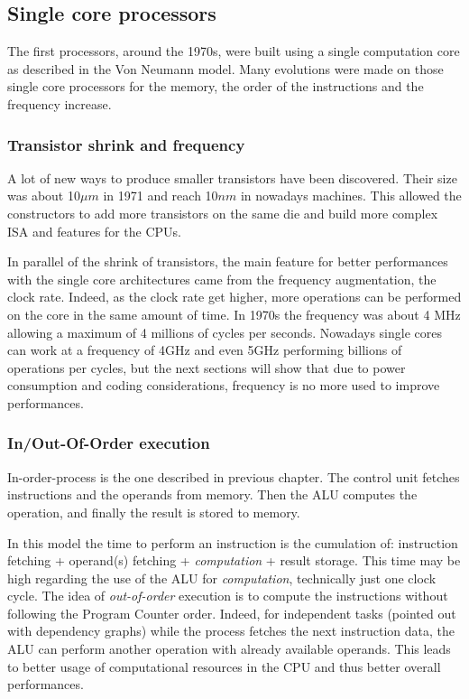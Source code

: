 \subsection{Single core processors}
The first processors, around the 1970s, were built using a single computation core as described in the Von Neumann model. 
Many evolutions were made on those single core processors for the memory, the order of the instructions and the frequency increase.

\subsubsection{Transistor shrink and frequency}
A lot of new ways to produce smaller transistors have been discovered.
Their size was about 10$\mu m$ in 1971 and reach 10$nm$ in nowadays machines.
This allowed the constructors to add more transistors on the same die and build more complex ISA and features for the CPUs. 

In parallel of the shrink of transistors, the main feature for better performances with the single core architectures came from the frequency augmentation, the clock rate. 
Indeed, as the clock rate get higher, more operations can be performed on the core in the same amount of time. 
In 1970s the frequency was about 4 MHz allowing a maximum of 4 millions of cycles per seconds. 
Nowadays single cores can work at a frequency of 4GHz and even 5GHz performing billions of operations per cycles, but the next sections will show that due to power consumption and coding considerations, frequency is no more used to improve performances. 

\subsubsection{In/Out-Of-Order execution} 
In-order-process is the one described in previous chapter. 
The control unit fetches instructions and the operands from memory. Then the ALU computes the operation, and finally the result is stored to memory.

In this model the time to perform an instruction is the cumulation of: instruction fetching + operand(s) fetching + \textit{computation} + result storage.
This time may be high regarding the use of the ALU for \textit{computation}, technically just one clock cycle. 
The idea of \textit{out-of-order} execution is to compute the instructions without following the Program Counter order. 
Indeed, for independent tasks (pointed out with dependency graphs) while the process fetches the next instruction data, the ALU can perform another operation with already available operands.
This leads to better usage of computational resources in the CPU and thus better overall performances. 

